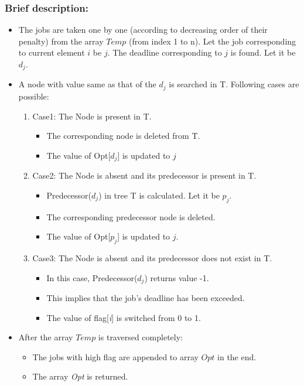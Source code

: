 \documentclass[pdftex,a4paper,12pt]{report}
\begin{document}
\subsubsection{Brief description:}
\begin{itemize}
\item The jobs are taken one by one (according to decreasing order of their penalty) from the array $Temp$ (from index 1 to n). Let the job corresponding to current element $i$ be $j$. The deadline corresponding to $j$ is found. Let it be \emph{$d_{j}$}.
\item A node with value same as that of the \emph{$d_{j}$} is searched in T. Following cases are possible:
\begin{enumerate}
\item Case1: The Node is present in T.
\begin{itemize}
\item The corresponding node is deleted from T.
\item The value of Opt[\emph{$d_{j}$}] is updated to $j$
\end{itemize}
\item Case2: The Node is absent and its predecessor is present in T.
\begin{itemize}
\item Predecessor(\emph{$d_{j}$}) in tree T is calculated. Let it be \emph{$p_{j}$}.
\item The corresponding predecessor node is deleted.
\item The value of Opt[\emph{$p_{j}$}] is updated to $j$.
\end{itemize}
\item Case3: The Node is absent and its predecessor does not exist in T.
\begin{itemize}
\item In this case, Predecessor(\emph{$d_{j}$}) returns value -1.
\item This implies that the job's deadline has been exceeded.
\item The value of flag[\emph{i}] is switched from 0 to 1.
\end{itemize}
\end{enumerate}
\item After the array $Temp$ is traversed completely:
\begin{itemize}
\item The jobs with high flag are appended to array $Opt$ in the end. 
\item The array \emph{Opt} is returned.
\end{itemize}

\end{itemize}
\end{document}

